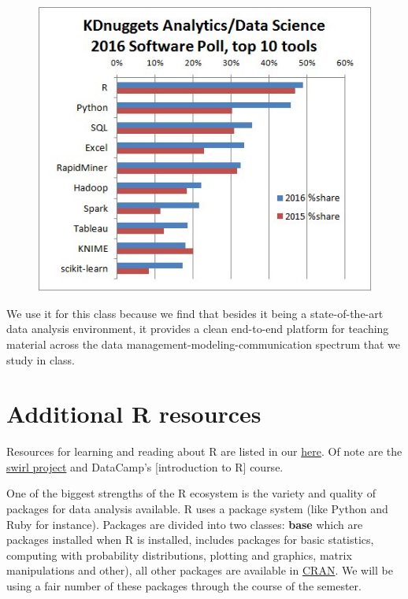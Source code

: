 \documentclass[]{book}
\theoremstyle{definition}
\theoremstyle{definition}
\theoremstyle{remark}
\begin{document}
\begin{figure}
\centering
\includegraphics{img/kdnuggets-2016.jpg}
\caption{}
\end{figure}

We use it for this class because we find that besides it being a
state-of-the-art data analysis environment, it provides a clean
end-to-end platform for teaching material across the data
management-modeling-communication spectrum that we study in class.

\section{Additional R resources}\label{additional-r-resources}

Resources for learning and reading about R are listed in our
\href{http://www.hcbravo.org/IntroDataScience/resources/}{here}. Of note
are the \href{http://swirlstats.com/}{swirl project} and DataCamp's
{[}introduction to R{]} course.

One of the biggest strengths of the R ecosystem is the variety and
quality of packages for data analysis available. R uses a package system
(like Python and Ruby for instance). Packages are divided into two
classes: \textbf{base} which are packages installed when R is installed,
includes packages for basic statistics, computing with probability
distributions, plotting and graphics, matrix manipulations and other),
all other packages are available in
\href{http://cran.r-project.org}{CRAN}. We will be using a fair number
of these packages through the course of the semester.
\end{document}
